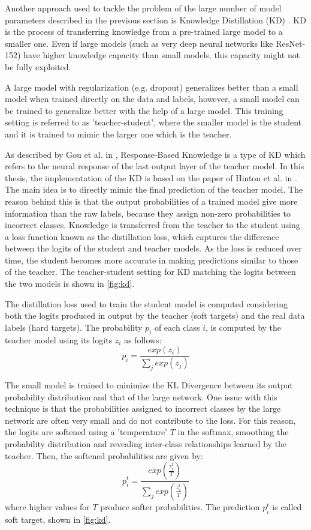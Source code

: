 Another approach used to tackle the problem of the large number of model parameters described in the previous section is Knowledge Distillation (KD) \cite{hinton2015distilling}. KD is the process of transferring knowledge from a pre-trained large model to a smaller one. Even if large models (such as very deep neural networks like ResNet-152) have higher knowledge capacity than small models, this capacity might not be fully exploited.
                   
A large model with regularization (e.g. dropout) generalizes better than a small model when trained directly on the data and labels, however, a small model can be trained to generalize better with the help of a large model. This training setting is referred to as 'teacher-student', where the smaller model is the student and it is trained to mimic the larger one which is the teacher.

As described by Gou et al. in \cite{gou2021knowledge},
Response-Based Knowledge is a type of KD which refers to the neural
response of the last output layer of the teacher model.
In this thesis, the implementation of the KD is based on the paper of Hinton et al. in \cite{hinton2015distilling}.
The main idea is to directly mimic the final prediction
of the teacher model.
The reason behind this is that the output probabilities of a trained model give more information than the raw labels, because they assign non-zero probabilities to incorrect classes.
Knowledge is transferred from the teacher to the student using a loss function known as the distillation loss, which captures the difference between the logits of the student and teacher models.
As the loss is reduced over time, the student becomes more accurate in making predictions similar to those of the teacher.
The teacher-student setting for KD matching the logits between the two models is shown in \autoref{fig:kd}.

The distillation loss used to train the student model is computed considering both the logits produced in output by the teacher (soft targets) and the real data labels (hard targets).
The probability $p_i$ of each class $i$, is computed by the teacher model using its logits $z_i$ as follows:
\begin{equation}
    p_i = \frac{exp(z_i)}{\sum_j exp(z_j)}
\end{equation}

The small model is trained to minimize the KL Divergence between its output probability distribution and that of the large network. One issue with this technique is that the probabilities assigned to incorrect classes by the large network are often very small and do not contribute to the loss. For this reason, the logits are softened using a 'temperature' $T$ in the softmax, smoothing the probability distribution and revealing inter-class relationships learned by the teacher. Then, the softened probabilities are given by:
\begin{equation}\label{eq:kd_prob}
    p_i^t = \frac{exp(\frac{z_i^t}{T})}{\sum_j exp(\frac{z_i^t}{T})}
\end{equation}
where higher values for $T$ produce softer probabilities. The prediction $p_i^t$ is called soft target, shown in \autoref{fig:kd}.

